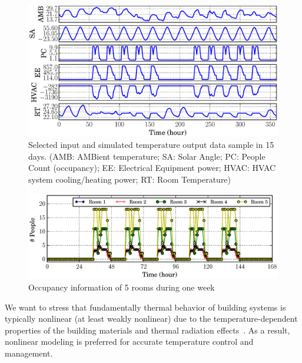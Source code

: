 \begin{figure}[t]
    \includegraphics[width=0.9\columnwidth]{figs/energyplus_review/energyplus}
    \caption{Selected \EP{} input and simulated temperature output data sample in
        15 days.  (AMB: AMBient temperature; SA: Solar Angle; PC: People Count
        (occupancy); EE: Electrical Equipment power; HVAC: HVAC system
        cooling/heating power; RT: Room Temperature)}
    \label{fig:energyplus-io-curve}
\end{figure}
\begin{figure}[t]
\centering
\includegraphics[width=0.9\columnwidth]{figs/energyplus_review/occupancy}
\caption{Occupancy information of 5 rooms during one week}
\label{fig:occupancy-curve}
\end{figure}

%

We want to stress that fundamentally thermal behavior of building
systems is typically nonlinear (at least weakly nonlinear) due to the
temperature-dependent properties of the building materials and thermal
radiation effects~\cite{Bergman:Book'11,LiuTan:ASPDAC'13}. As a
result, nonlinear modeling is preferred for accurate temperature
control and management.

